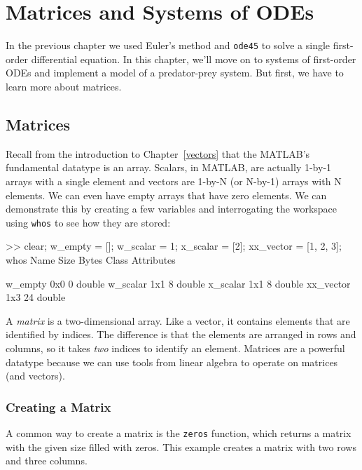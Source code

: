 \chapter{Matrices and Systems of ODEs}
\label{systems}


In the previous chapter we used Euler's method and \lstinline{ode45} to solve a single first-order differential equation.  In this chapter, we'll move on to systems of first-order ODEs and implement a model of a predator-prey system.  But first, we have to learn more about matrices.


\section{Matrices}

Recall from the introduction to Chapter~\ref{vectors} that the MATLAB's fundamental datatype is an array.  Scalars, in MATLAB, are actually 1-by-1 arrays with a single element and vectors are 1-by-N (or N-by-1) arrays with N elements.  We can even have empty arrays that have zero elements. We can demonstrate this by creating a few variables and interrogating the workspace using \lstinline{whos} to see how they are stored:

\begin{code}
     >> clear;
     w_empty = [];
     w_scalar = 1;
     x_scalar = [2];
     xx_vector = [1, 2, 3];
     whos
       Name           Size            Bytes  Class     Attributes
     
       w_empty        0x0                 0  double              
       w_scalar       1x1                 8  double              
       x_scalar       1x1                 8  double              
       xx_vector      1x3                24  double    
\end{code}

A \emph{matrix} is a two-dimensional array.  Like a vector,
it contains elements that are identified by indices.  The difference
is that the elements are arranged in rows and columns, so it takes
\emph{two} indices to identify an element.  Matrices are a powerful datatype because we can use tools from linear algebra to operate on matrices (and vectors).  

\subsection{Creating a Matrix}


A common way to create a matrix is the \lstinline{zeros} function,
which returns a matrix with the given size filled with zeros.
This example creates a matrix with two rows and three columns.

